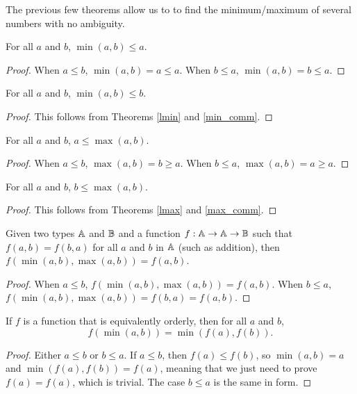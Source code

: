 \documentclass[../../math.tex]{subfiles}
\begin{document}
The previous few theorems allow us to to find the minimum/maximum of several
numbers with no ambiguity.

\begin{theorem} \label{lmin}
    For all $a$ and $b$, $\min(a, b) \leq a$.
\end{theorem}
\begin{proof}
    When $a \leq b$, $\min(a, b) = a \leq a$.  When $b \leq a$, $\min(a, b) = b
    \leq a$.
\end{proof}

\begin{theorem} \label{rmin}
    For all $a$ and $b$, $\min(a, b) \leq b$.
\end{theorem}
\begin{proof}
    This follows from Theorems \ref{lmin} and \ref{min_comm}.
\end{proof}

\begin{theorem} \label{lmax}
    For all $a$ and $b$, $a \leq \max(a, b)$.
\end{theorem}
\begin{proof}
    When $a \leq b$, $\max(a, b) = b \geq a$.  When $b \leq a$, $\max(a, b) = a
    \geq a$.
\end{proof}

\begin{theorem} \label{rmax}
    For all $a$ and $b$, $b \leq \max(a, b)$.
\end{theorem}
\begin{proof}
    This follows from Theorems \ref{lmax} and \ref{max_comm}.
\end{proof}

\begin{theorem}
    Given two types $\mathbb{A}$ and $\mathbb{B}$ and a function $f : \mathbb{A} \rightarrow \mathbb{A}
    \rightarrow \mathbb{B}$ such that $f(a, b) = f(b, a)$ for all $a$ and $b$ in $\mathbb{A}$
    (such as addition), then $f(\min(a, b), \max(a, b)) = f(a, b)$.
\end{theorem}
\begin{proof}
    When $a \leq b$, $f(\min(a, b), \max(a, b)) = f(a, b)$.  When $b \leq a$,
    $f(\min(a, b), \max(a, b)) = f(b, a) = f(a, b)$.
\end{proof}

\begin{theorem} \label{homo-min}
    If $f$ is a function that is equivalently orderly, then for all $a$ and $b$,
    \[
        f(\min(a, b)) = \min(f(a), f(b)).
    \]
\end{theorem}
\begin{proof}
    Either $a \leq b$ or $b \leq a$.  If $a \leq b$, then $f(a) \leq f(b)$, so
    $\min(a, b) = a$ and $\min(f(a), f(b)) = f(a)$, meaning that we just need to
    prove $f(a) = f(a)$, which is trivial.  The case $b \leq a$ is the same in
    form.
\end{proof}
\end{document}
